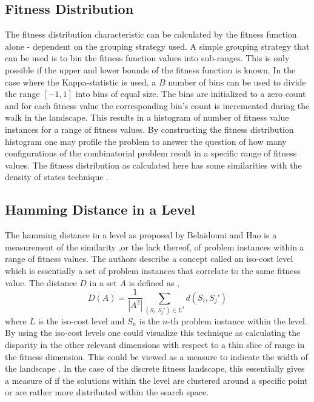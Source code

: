 \documentclass[journal,comsoc]{IEEEtran}
\begin{document}
\subsection{Fitness Distribution}

The fitness distribution characteristic can be calculated by the fitness function alone - dependent on the grouping strategy used. A simple grouping strategy that can be used is to bin the fitness function values into sub-ranges. This is only possible if the upper and lower bounds of the fitness function is known. In the case where the Kappa-statistic is used, a $B$ number of bins can be used to divide the range $[-1,1]$ into bins of equal size. The bins are initialized to a zero count and for each fitness value the corresponding bin's count is incremented during the walk in the landscape. This results in a histogram of number of fitness value instances for a range of fitness values. By constructing the fitness distribution histogram one may profile the problem to answer the question of how many configurations of the combinatorial problem result in a specific range of fitness values. The fitness distribution as calculated here has some similarities with the density of states technique \cite{asselmeyer1996smoothing}.

\subsection{Hamming Distance in a Level}

The hamming distance in a level as proposed by Belaidouni and Hao \cite{belaidouni1999landscapes} is a measurement of the similarity ,or the lack thereof, of problem instances within a range of fitness values. The authors describe a concept called an iso-cost level which is essentially a set of problem instances that correlate to the same fitness value. The distance $D$ in a set $A$  is defined as \cite{belaidouni1999landscapes}, 
$$
	D(A) = \frac{1}{|A^2|} \sum_{(S_i,S_j') \in L^2} d(S_i, S_j')
$$
where $L$ is the iso-cost level and $S_n$ is the $n$-th problem instance within the level. By using the iso-cost levels one could visualize this technique as calculating the disparity in the other relevant dimensions with respect to a thin slice of range in the fitness dimension. This could be viewed as a measure to indicate the width of the landscape \cite{belaidouni1999landscapes}. In the case of the discrete fitness landscape, this essentially gives a measure of if the solutions within the level are clustered around a specific point or are rather more distributed within the search space.
\end{document}
